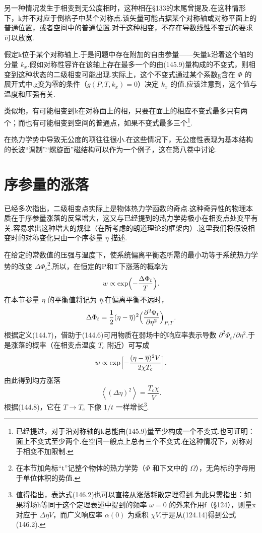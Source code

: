 另一种情况发生于相变到无公度相时，这种相在§133的末尾曾提及.在这种情形下，k并不对应于倒格子中某个对称点.该矢量可能占据某个对称轴或对称平面上的普通位置，或者空间中的普通位置.对于这种相变，不存在导数线性不变式的要求可以放宽.

假定k位于某个对称轴上.于是问题中存在附加的自由参量——矢量k沿着这个轴的分量 $k_x$.假如对称性容许在该轴上存在最多一个的由(145.9)量构成的不变式，则相变到这种状态的二级相变可能出现.实际上，这个不变式通过某个系数g含在 $\Phi$ 的展开式中.g变为零的条件（$g(P,T,k_x)=0$）决定 $k_x$ 的值.应该注意到，这个值与温度和压强有关.

类似地，有可能相变到k在对称面上的相，只要在面上的相应不变式最多只有两个；而也有可能相变到空间的普通点，如果不变式最多三个\footnote{已经提过，对于沿对称轴的k总能由(145.9)量至少构成一个不变式.也可证明：面上不变式至少两个.在空间一般点上总有三个不变式.在这种情况下，对称对于相变不加限制.}.

在热力学势中导致无公度的项往往很小.在这些情况下，无公度性表现为基本结构的长波“调制”.“螺旋面”磁结构可以作为一个例子，这在第八卷中讨论.

\section{序参量的涨落}

已经多次指出，二级相变点实际上是物体热力学函数的奇点.这种奇异性的物理本质在于序参量涨落的反常增大，这又与已经提到的热力学势极小在相变点处变平有关.容易求出这种增大的规律（在所考虑的朗道理论的框架内）.这里我们将假设相变时的对称变化只由一个序参量 $\eta$ 描述.

在给定的常数值的压强与温度下，使系统偏离平衡态所需的最小功等于系统热力学势的改变 $\Delta\Phi_t$\footnote{在本节加角标“t”记整个物体的热力学势（$\Phi$ 和下文中的 $\Omega$），无角标的字母用于单位体积的势值.}.所以，在恒定的P和T下涨落的概率为
\begin{equation}
  w\propto\exp\Bigl(-\frac{\Delta\Phi_t}{T}\Bigr).
\end{equation}
在本节参量 $\eta$ 的平衡值将记为 $\overline{\eta}$.在偏离平衡不远时，
\begin{equation*}
  \Delta\Phi_t=\frac{1}{2}(\eta-\overline{\eta})^2
  \Bigl(\frac{\partial^2\Phi_t}{\partial\eta^2}\Bigr)_{P,T}.
\end{equation*}
根据定义(144.7)，借助于(144.6)可用物质在弱场中的响应率表示导数 $\partial^2\Phi_t/\partial\eta^2$.于是涨落的概率（在相变点温度 $T_c$ 附近）可写成
\begin{equation*}
  w\propto\exp\Bigl[-\frac{(\eta-\overline{\eta})^2V}{2\chi T_c}\Bigr].
\end{equation*}
由此得到均方涨落
\begin{equation}
  \left\langle(\Delta\eta)^2\right\rangle=\frac{T_c\chi}{V}.
\end{equation}
根据(144.8)，它在 $T\to T_c$ 下像 $1/t$ 一样增长\footnote{值得指出，表达式(146.2)也可以直接从涨落耗散定理得到.为此只需指出：如果将场h等同于这个定理表述中提到的频率 $\omega=0$ 的外来作用f（§124），则量x对应于 $\Delta\eta V$，而广义响应率 $\alpha(0)$ 为乘积 $\chi V$.于是从(124.14)得到公式(146.2).}.

